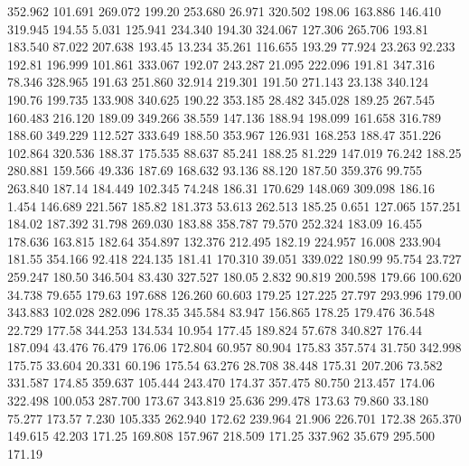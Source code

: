  352.962  101.691  269.072       199.20
 253.680   26.971  320.502       198.06
 163.886  146.410  319.945       194.55
   5.031  125.941  234.340       194.30
 324.067  127.306  265.706       193.81
 183.540   87.022  207.638       193.45
  13.234   35.261  116.655       193.29
  77.924   23.263   92.233       192.81
 196.999  101.861  333.067       192.07
 243.287   21.095  222.096       191.81
 347.316   78.346  328.965       191.63
 251.860   32.914  219.301       191.50
 271.143   23.138  340.124       190.76
 199.735  133.908  340.625       190.22
 353.185   28.482  345.028       189.25
 267.545  160.483  216.120       189.09
 349.266   38.559  147.136       188.94
 198.099  161.658  316.789       188.60
 349.229  112.527  333.649       188.50
 353.967  126.931  168.253       188.47
 351.226  102.864  320.536       188.37
 175.535   88.637   85.241       188.25
  81.229  147.019   76.242       188.25
 280.881  159.566   49.336       187.69
 168.632   93.136   88.120       187.50
 359.376   99.755  263.840       187.14
 184.449  102.345   74.248       186.31
 170.629  148.069  309.098       186.16
   1.454  146.689  221.567       185.82
 181.373   53.613  262.513       185.25
   0.651  127.065  157.251       184.02
 187.392   31.798  269.030       183.88
 358.787   79.570  252.324       183.09
  16.455  178.636  163.815       182.64
 354.897  132.376  212.495       182.19
 224.957   16.008  233.904       181.55
 354.166   92.418  224.135       181.41
 170.310   39.051  339.022       180.99
  95.754   23.727  259.247       180.50
 346.504   83.430  327.527       180.05
   2.832   90.819  200.598       179.66
 100.620   34.738   79.655       179.63
 197.688  126.260   60.603       179.25
 127.225   27.797  293.996       179.00
 343.883  102.028  282.096       178.35
 345.584   83.947  156.865       178.25
 179.476   36.548   22.729       177.58
 344.253  134.534   10.954       177.45
 189.824   57.678  340.827       176.44
 187.094   43.476   76.479       176.06
 172.804   60.957   80.904       175.83
 357.574   31.750  342.998       175.75
  33.604   20.331   60.196       175.54
  63.276   28.708   38.448       175.31
 207.206   73.582  331.587       174.85
 359.637  105.444  243.470       174.37
 357.475   80.750  213.457       174.06
 322.498  100.053  287.700       173.67
 343.819   25.636  299.478       173.63
  79.860   33.180   75.277       173.57
   7.230  105.335  262.940       172.62
 239.964   21.906  226.701       172.38
 265.370  149.615   42.203       171.25
 169.808  157.967  218.509       171.25
 337.962   35.679  295.500       171.19
